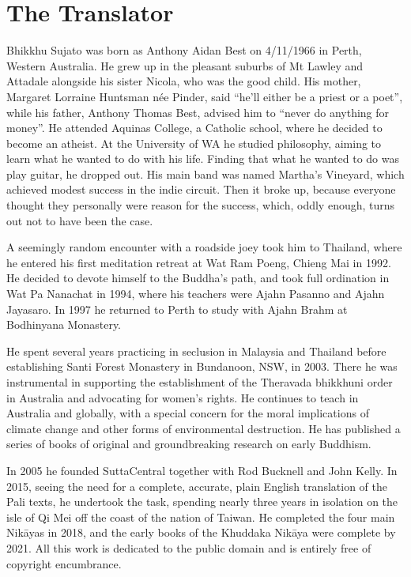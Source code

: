 \documentclass[12pt,openany]{book}%
\begin{document}
\section*{The Translator}

Bhikkhu Sujato was born as Anthony Aidan Best on 4/11/1966 in Perth, Western Australia. He grew up in the pleasant suburbs of Mt Lawley and Attadale alongside his sister Nicola, who was the good child. His mother, Margaret Lorraine Huntsman née Pinder, said “he’ll either be a priest or a poet”, while his father, Anthony Thomas Best, advised him to “never do anything for money”. He attended Aquinas College, a Catholic school, where he decided to become an atheist. At the University of WA he studied philosophy, aiming to learn what he wanted to do with his life. Finding that what he wanted to do was play guitar, he dropped out. His main band was named Martha’s Vineyard, which achieved modest success in the indie circuit. Then it broke up, because everyone thought they personally were reason for the success, which, oddly enough, turns out not to have been the case. 

A seemingly random encounter with a roadside joey took him to Thailand, where he entered his first meditation retreat at Wat Ram Poeng, Chieng Mai in 1992. He decided to devote himself to the Buddha’s path, and took full ordination in Wat Pa Nanachat in 1994, where his teachers were Ajahn Pasanno and Ajahn Jayasaro. In 1997 he returned to Perth to study with Ajahn Brahm at Bodhinyana Monastery. 

He spent several years practicing in seclusion in Malaysia and Thailand before establishing Santi Forest Monastery in Bundanoon, NSW, in 2003. There he was instrumental in supporting the establishment of the Theravada bhikkhuni order in Australia and advocating for women’s rights. He continues to teach in Australia and globally, with a special concern for the moral implications of climate change and other forms of environmental destruction. He has published a series of books of original and groundbreaking research on early Buddhism. 

In 2005 he founded SuttaCentral together with Rod Bucknell and John Kelly. In 2015, seeing the need for a complete, accurate, plain English translation of the Pali texts, he undertook the task, spending nearly three years in isolation on the isle of Qi Mei off the coast of the nation of Taiwan. He completed the four main \textsanskrit{Nikāyas} in 2018, and the early books of the Khuddaka \textsanskrit{Nikāya} were complete by 2021. All this work is dedicated to the public domain and is entirely free of copyright encumbrance. 
\end{document}
